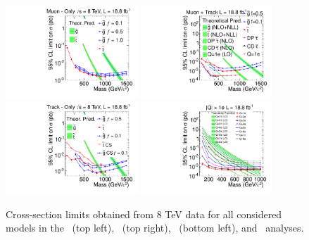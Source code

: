 \begin{figure}
\centering
  \includegraphics[clip=true, trim=0.0cm 0cm 2.8cm 0cm, width=0.44\textwidth]{figures/muonly/MOExclusionLog}
  \includegraphics[clip=true, trim=0.0cm 0cm 2.8cm 0cm, width=0.44\textwidth]{figures/tkmu/MuExclusionLog} \\
  \includegraphics[clip=true, trim=0.0cm 0cm 2.8cm 0cm, width=0.44\textwidth]{figures/tkonly/TkExclusionLog}
  \includegraphics[clip=true, trim=0.0cm 0cm 2.8cm 0cm, width=0.44\textwidth]{figures/multi/HQExclusionLog}
\caption[Cross-section limits obtained from 8 TeV data for all considered models in the analyses]
{Cross-section limits obtained from 8 TeV data for all considered models in the \muononly\ (top left), \tktof\ (top right), \tkonly\ (bottom left), and \multi\ analyses.}
    \label{fig:Exclusion}
\end{figure}

